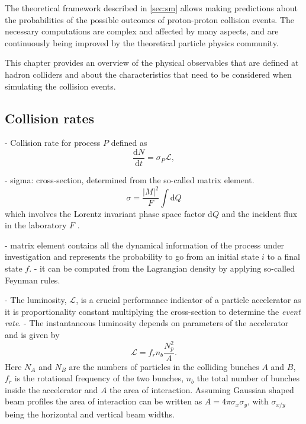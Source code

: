 
The theoretical framework described in \cref{sec:sm} allows making predictions about the probabilities of the possible outcomes of proton-proton collision events. 
The necessary computations are complex and affected by many aspects, and are continuously being improved by the theoretical particle physics community.

This chapter provides an overview of the physical observables that are defined at hadron colliders and about the characteristics that need to be considered when simulating the collision events. 


\subsection{Collision rates}
- Collision rate for process $P$ defined as
\begin{equation}
  \frac{\mathrm{d}N}{\mathrm{d}t} = \sigma_P \mathcal{L},
\end{equation}

- sigma: cross-section, determined from the so-called matrix element. 
\begin{equation}
  \sigma = \frac{|M|^2}{F} \int \text{d}Q
\end{equation}
which involves the Lorentz invariant phase space factor d$Q$ and the incident flux in the laboratory $F$ \cite{Halzen:1984mc}.

- matrix element contains all the dynamical information of the process under investigation and represents the probability to go from an initial state $i$ to a final state $f$. 
- it can be computed from the Lagrangian density by applying so-called Feynman rules.


- The luminosity, $\mathcal{L}$, is a crucial performance indicator of a particle accelerator as it is proportionality constant multiplying the cross-section to determine the \emph{event rate}.
-  The instantaneous luminosity depends on parameters of the accelerator and is given by
\begin{equation}
  \mathcal{L} = f_rn_b\frac{N_p^2}{A}.
\end{equation}
Here $N_A$ and $N_B$ are the numbers of particles in the colliding bunches $A$ and $B$, $f_r$ is the rotational frequency of the two bunches, $n_b$ the total number of bunches inside the accelerator and $A$ the area of interaction. Assuming Gaussian shaped beam profiles the area of interaction can be written as $A = 4\pi \sigma_x \sigma_y$, with $\sigma_{x/y}$ being the horizontal and vertical beam widths.


